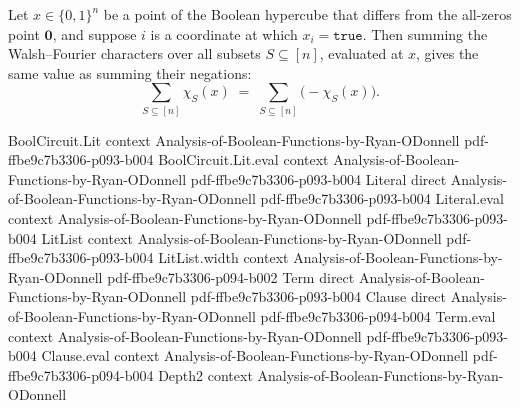\begin{lemma}
\label{BoolFourier.sum_char_S_ne_zero_aux_h_pair}
\leanok
{}
Let $x \in \{0,1\}^n$ be a point of the Boolean hypercube that differs from the
all-zeros point $\mathbf{0}$, and suppose $i$ is a coordinate at which $x_i =
\mathtt{true}$. Then summing the Walsh–Fourier characters over all subsets $S \subseteq
[n]$, evaluated at $x$, gives the same value as summing their negations:
\[
  \sum_{S \subseteq [n]} \chi_S(x) \;=\; \sum_{S \subseteq [n]} \bigl(-\chi_S(x)\bigr).
\]
\end{lemma}

\begin{lemma}
\label{BoolFourier.expectation_char_nonempty_aux_h_exp}
\leanok
{}
\proofstep
  {BoolCircuit.Lit}
  {context}
  {Analysis-of-Boolean-Functions-by-Ryan-ODonnell}
  {pdf-ffbe9c7b3306-p093-b004}
\proofstep
  {BoolCircuit.Lit.eval}
  {context}
  {Analysis-of-Boolean-Functions-by-Ryan-ODonnell}
  {pdf-ffbe9c7b3306-p093-b004}
\proofstep
  {Literal}
  {direct}
  {Analysis-of-Boolean-Functions-by-Ryan-ODonnell}
  {pdf-ffbe9c7b3306-p093-b004}
\proofstep
  {Literal.eval}
  {context}
  {Analysis-of-Boolean-Functions-by-Ryan-ODonnell}
  {pdf-ffbe9c7b3306-p093-b004}
\proofstep
  {LitList}
  {context}
  {Analysis-of-Boolean-Functions-by-Ryan-ODonnell}
  {pdf-ffbe9c7b3306-p093-b004}
\proofstep
  {LitList.width}
  {context}
  {Analysis-of-Boolean-Functions-by-Ryan-ODonnell}
  {pdf-ffbe9c7b3306-p094-b002}
\proofstep
  {Term}
  {direct}
  {Analysis-of-Boolean-Functions-by-Ryan-ODonnell}
  {pdf-ffbe9c7b3306-p093-b004}
\proofstep
  {Clause}
  {direct}
  {Analysis-of-Boolean-Functions-by-Ryan-ODonnell}
  {pdf-ffbe9c7b3306-p094-b004}
\proofstep
  {Term.eval}
  {context}
  {Analysis-of-Boolean-Functions-by-Ryan-ODonnell}
  {pdf-ffbe9c7b3306-p093-b004}
\proofstep
  {Clause.eval}
  {context}
  {Analysis-of-Boolean-Functions-by-Ryan-ODonnell}
  {pdf-ffbe9c7b3306-p094-b004}
\proofstep
  {Depth2}
  {context}
  {Analysis-of-Boolean-Functions-by-Ryan-ODonnell}

\end{lemma}
